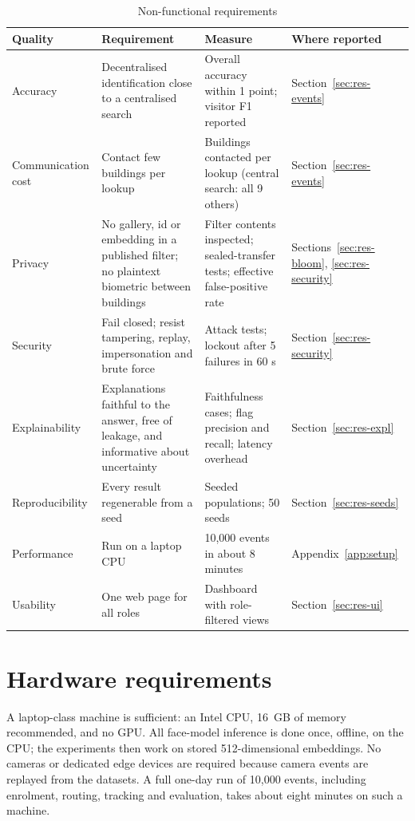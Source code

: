 \documentclass[12pt,a4paper,oneside]{report}
\begin{document}
\begin{table}[htbp]
\centering
\caption{Non-functional requirements}\label{tab:nfr}
{\small\setlength{\tabcolsep}{4pt}\renewcommand{\arraystretch}{1.2}
\begin{tabular}{|p{2.45cm}|p{5.29cm}|p{3.40cm}|p{2.83cm}|}\hline
\textbf{Quality} & \textbf{Requirement} & \textbf{Measure} & \textbf{Where reported}\\\hline
Accuracy & Decentralised identification close to a centralised search & Overall accuracy within 1 point; visitor F1 reported & Section~\ref{sec:res-events}\\\hline
Communication cost & Contact few buildings per lookup & Buildings contacted per lookup (central search: all 9 others) & Section~\ref{sec:res-events}\\\hline
Privacy & No gallery, id or embedding in a published filter; no plaintext biometric between buildings & Filter contents inspected; sealed-transfer tests; effective false-positive rate & Sections~\ref{sec:res-bloom}, \ref{sec:res-security}\\\hline
Security & Fail closed; resist tampering, replay, impersonation and brute force & Attack tests; lockout after 5 failures in 60 s & Section~\ref{sec:res-security}\\\hline
Explainability & Explanations faithful to the answer, free of leakage, and informative about uncertainty & Faithfulness cases; flag precision and recall; latency overhead & Section~\ref{sec:res-expl}\\\hline
Reproducibility & Every result regenerable from a seed & Seeded populations; 50 seeds & Section~\ref{sec:res-seeds}\\\hline
Performance & Run on a laptop CPU & 10,000 events in about 8 minutes & Appendix~\ref{app:setup}\\\hline
Usability & One web page for all roles & Dashboard with role-filtered views & Section~\ref{sec:res-ui}\\\hline
\end{tabular}}
\end{table}

\section{Hardware requirements}
A laptop-class machine is sufficient: an Intel CPU, 16~GB of memory recommended, and no GPU. All face-model inference is done once, offline, on the CPU; the experiments then work on stored 512-dimensional embeddings. No cameras or dedicated edge devices are required because camera events are replayed from the datasets. A full one-day run of 10,000 events, including enrolment, routing, tracking and evaluation, takes about eight minutes on such a machine.
\end{document}
